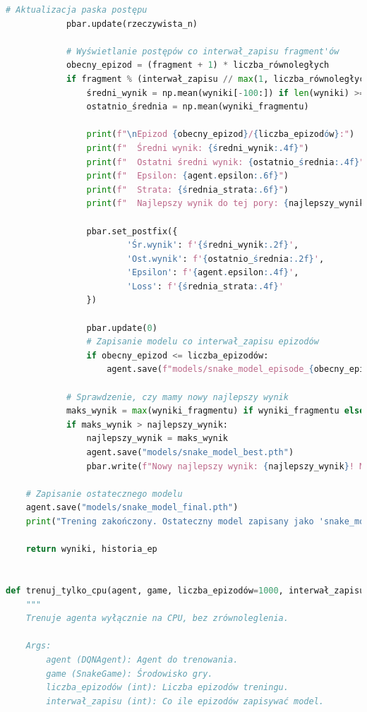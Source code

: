 \documentclass[a4paper,12pt]{article}
\begin{document}
\begin{lstlisting}[language=Python]
            # Aktualizacja paska postępu
            pbar.update(rzeczywista_n)
            
            # Wyświetlanie postępów co interwał_zapisu fragment'ów
            obecny_epizod = (fragment + 1) * liczba_równoległych
            if fragment % (interwał_zapisu // max(1, liczba_równoległych)) == 0 or fragment == liczba_fragmentów - 1:
                średni_wynik = np.mean(wyniki[-100:]) if len(wyniki) >= 100 else np.mean(wyniki)
                ostatnio_średnia = np.mean(wyniki_fragmentu)
    
                print(f"\nEpizod {obecny_epizod}/{liczba_epizodów}:")
                print(f"  Średni wynik: {średni_wynik:.4f}")
                print(f"  Ostatni średni wynik: {ostatnio_średnia:.4f}")
                print(f"  Epsilon: {agent.epsilon:.6f}")
                print(f"  Strata: {średnia_strata:.6f}")
                print(f"  Najlepszy wynik do tej pory: {najlepszy_wynik}")
    
                pbar.set_postfix({
                        'Śr.wynik': f'{średni_wynik:.2f}',
                        'Ost.wynik': f'{ostatnio_średnia:.2f}',
                        'Epsilon': f'{agent.epsilon:.4f}',
                        'Loss': f'{średnia_strata:.4f}'
                })
                
                pbar.update(0)
                # Zapisanie modelu co interwał_zapisu epizodów
                if obecny_epizod <= liczba_epizodów:
                    agent.save(f"models/snake_model_episode_{obecny_epizod}.pth")
            
            # Sprawdzenie, czy mamy nowy najlepszy wynik
            maks_wynik = max(wyniki_fragmentu) if wyniki_fragmentu else 0
            if maks_wynik > najlepszy_wynik:
                najlepszy_wynik = maks_wynik
                agent.save("models/snake_model_best.pth")
                pbar.write(f"Nowy najlepszy wynik: {najlepszy_wynik}! Model zapisany jako 'snake_model_best.pth'")
    
    # Zapisanie ostatecznego modelu
    agent.save("models/snake_model_final.pth")
    print("Trening zakończony. Ostateczny model zapisany jako 'snake_model_final.pth'")
    
    return wyniki, historia_ep


def trenuj_tylko_cpu(agent, game, liczba_epizodów=1000, interwał_zapisu=100):
    """
    Trenuje agenta wyłącznie na CPU, bez zrównoleglenia.
    
    Args:
        agent (DQNAgent): Agent do trenowania.
        game (SnakeGame): Środowisko gry.
        liczba_epizodów (int): Liczba epizodów treningu.
        interwał_zapisu (int): Co ile epizodów zapisywać model.
        

\end{lstlisting}
\end{document}
